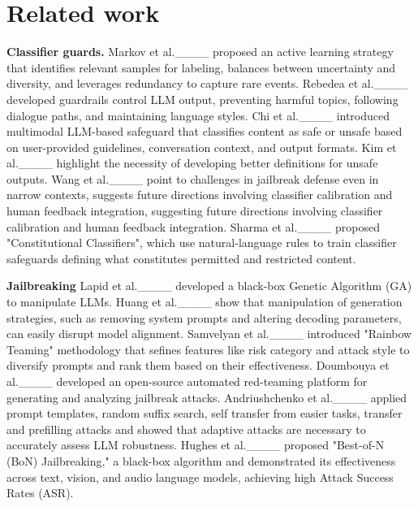 \section{Related work}
\textbf{Classifier guards.} Markov et al.____ proposed an active learning strategy that identifies relevant samples for labeling, balances between uncertainty and diversity, and leverages redundancy to capture rare events. Rebedea et al.____ developed guardrails control LLM output, preventing harmful topics, following dialogue paths, and maintaining language styles. Chi et al.____ introduced multimodal LLM-based safeguard that classifies content as safe or unsafe based on user-provided guidelines, conversation context, and output formats. Kim et al.____ highlight the necessity of developing better definitions for unsafe outputs. Wang et al.____ point to challenges in jailbreak defense even in narrow contexts, suggests future directions involving classifier calibration and human feedback integration, suggesting future directions involving classifier calibration and human feedback integration. Sharma et al.____ proposed "Constitutional Classifiers", which use natural-language rules to train classifier safeguards defining what constitutes permitted and restricted content.

\textbf{Jailbreaking} Lapid et al.____ developed a black-box Genetic Algorithm (GA) to manipulate LLMs. Huang et al.____ show that manipulation of generation strategies, such as removing system prompts and altering decoding parameters, can easily disrupt model alignment. Samvelyan et al.____ introduced "Rainbow Teaming" methodology that sefines features like risk category and attack style to diversify prompts and rank them based on their effectiveness. Doumbouya et al.____ developed an open-source automated red-teaming platform for generating and analyzing jailbreak attacks. Andriushchenko et al.____ applied prompt templates, random suffix search, self transfer from easier tasks, transfer and prefilling attacks and showed that adaptive attacks are necessary to accurately assess LLM robustness. Hughes et al.____ proposed "Best-of-N (BoN) Jailbreaking," a black-box algorithm and demonstrated its effectiveness across text, vision, and audio language models, achieving high Attack Success Rates (ASR).